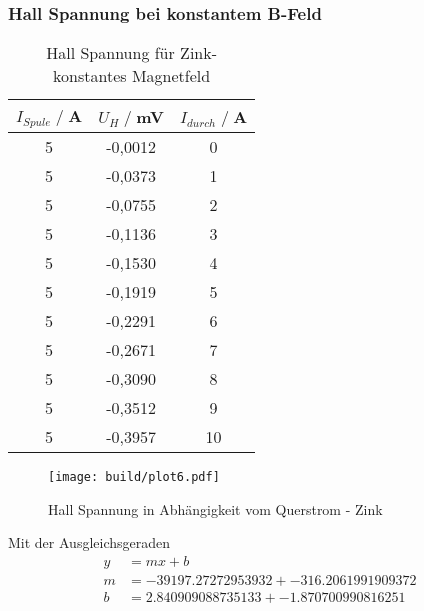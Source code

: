 \subsubsection{Hall Spannung bei konstantem B-Feld}
\begin{table}[H]
    \centering
    \begin{tabular}{c c c}
        \toprule
        $I_{Spule} \;/\;$A & $U_H\;/\;$mV & $I_{durch} \;/\;$A\\
        \midrule
            5                   &-0,0012&             0\\
            5                   &-0,0373&             1\\
            5                   &-0,0755&             2\\
            5                   &-0,1136&             3\\
            5                   &-0,1530&             4\\
            5                   &-0,1919&             5\\
            5                   &-0,2291&             6\\
            5                   &-0,2671&             7\\
            5                   &-0,3090&             8\\
            5                   &-0,3512&             9\\
            5                   &-0,3957&             10\\
        \bottomrule
    \end{tabular}
    \caption{Hall Spannung für Zink- konstantes Magnetfeld}
    \label{tab:Zn_B}
\end{table}
\begin{figure}[H]
    \centering
    \texttt{[image: build/plot6.pdf]}
    \caption{Hall Spannung in Abhängigkeit vom Querstrom - Zink}
    \label{fig:Zn_B}
\end{figure}
Mit der Ausgleichsgeraden
\begin{align*}
    y &= mx + b\\
    m &= -39197.27272953932 +- 316.2061991909372\\
    b &=  2.840909088735133 +- 1.870700990816251\\ 
\end{align*}

